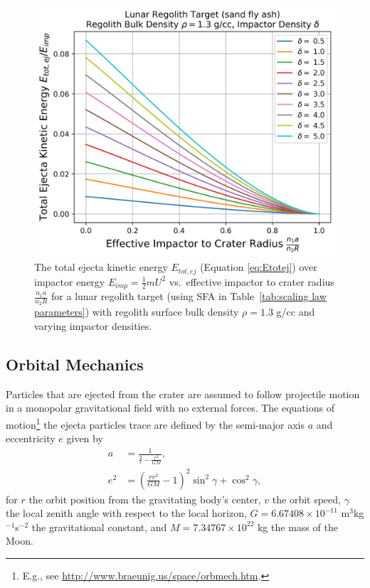 \documentclass{article}
\begin{document}
\begin{figure}[!htb]
	\centering
	\includegraphics[width=0.8\linewidth]{TotalEjectaKE_vs_EffectiveCraterSize.png}
	\caption{The total ejecta kinetic energy $E_{tot,ej}$ (Equation \eqref{eq:Etotej}) over impactor energy $E_{imp} = \frac{1}{2}mU^2$ vs.\ effective impactor to crater radius $\frac{n_1 a}{n_2 R}$ for a lunar regolith target (using SFA in Table~\ref{tab:scaling law parameters}) with regolith surface bulk density $\rho = 1.3$ g/cc and varying impactor densities. }\label{fig:TotalEjectaKE_vs_EffectiveCraterSize}
\end{figure}



\subsection{Orbital Mechanics}\label{ssec:Orbital Mechanics}

Particles that are ejected from the crater are assumed to follow projectile motion in a monopolar gravitational field with no external forces. The equations of motion\footnote{E.g., see \href{http://www.braeunig.us/space/orbmech.htm}{http://www.braeunig.us/space/orbmech.htm}.} the ejecta particles trace are defined by the semi-major axis $a$ and eccentricity $e$ given by
\begin{align}
a &= \frac{1}{\frac{2}{r} - \frac{v^2}{GM}},\label{eq:a_GM}\\
e^2 &= \left(\frac{rv^2}{GM} - 1\right)^2\sin^2\gamma + \cos^2\gamma,\label{eq:e_GM}
\end{align}
for $r$ the orbit position from the gravitating body's center, $v$ the orbit speed, $\gamma$ the local zenith angle with respect to the local horizon, $G = 6.67408\times 10^{-11}$ m$^3$kg$^{-1}$s$^{-2}$ the gravitational constant, and $M = 7.34767\times 10^{22}$ kg the mass of the Moon.
\end{document}
